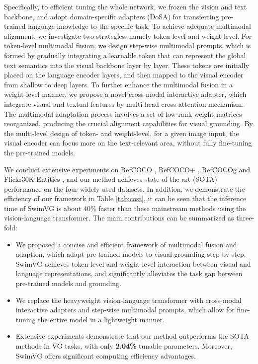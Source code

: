 Specifically, to efficient tuning the whole network, we frozen the vision and text backbone, and adopt domain-specific adapters (DoSA) for transferring pre-trained language knowledge to the specific task. To achieve adequate multimodal alignment, we investigate two strategies, namely token-level and weight-level. {For token-level multimodal fusion, we design step-wise multimodal prompts, which is formed by gradually integrating a learnable token that can represent the global text semantics into the visual backbone layer by layer.} These tokens are initially placed on the language encoder layers, and then mapped to the visual encoder from shallow to deep layers. To further enhance the multimodal fusion in a weight-level manner, we propose a novel cross-modal interactive adapter, which integrate visual and textual features by multi-head cross-attention mechanism. The multimodal adaptation process involves a set of low-rank weight matrices reorganized, producing the crucial alignment capabilities for visual grounding. By the multi-level design of token- and weight-level, for a given image input, the visual encoder can focus more on the text-relevant area, without fully fine-tuning the pre-trained models. 

We conduct extensive experiments on RefCOCO \cite{yu2016refcoco}, RefCOCO+ \cite{yu2016refcoco}, RefCOCOg \cite{mao2016refcocogg,nagaraja2016refcocogu} and Flickr30K Entities \cite{plummer2015flickr30k}, and our method achieves state-of-the-art (SOTA) performance on the four widely used datasets. In addition, we demonstrate the efficiency of our framework in Table \ref{tab:cost}, it can be seen that the inference time of SwimVG is about 40\% faster than these mainstream methods using the vision-language transformer. The main contributions can be summarized as three-fold:
\begin{itemize}
  \item 
  We proposed a concise and efficient framework of multimodal fusion and adaption, which adapt pre-trained models to visual grounding step by step. SwimVG achieves token-level and weight-level interaction between visual and language representations, and significantly alleviates the task gap between pre-trained models and grounding.
  
  \item We replace the heavyweight vision-language transformer with cross-modal interactive adapters and step-wise multimodal prompts, which allow for fine-tuning the entire model in a lightweight manner.

  \item
  Extensive experiments demonstrate that our method outperforms the SOTA methods in VG tasks, with only \textbf{2.04\%} tunable parameters. Moreover, SwimVG offers significant computing efficiency advantages.

\end{itemize}

